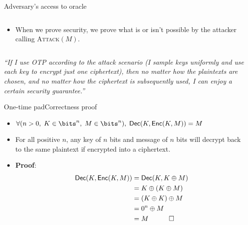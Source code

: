 \documentclass[aspectratio=169, lualatex, handout]{beamer}
\begin{document}
\begin{frame}{Adversary's access to oracle}
	\begin{columns}[c]
		\begin{column}{0.5\textwidth}
			\begin{itemize}
				\item When we prove security, we prove what is or isn’t possible by the attacker calling \textsc{Attack}$(M)$.
			\end{itemize}
		\end{column}
		\begin{column}{0.5\textwidth}
		\end{column}
	\end{columns}
\end{frame}

\begin{frame}
	\begin{center}
		\Large\textit{``If I use OTP according to the attack scenario (I sample keys uniformly and use each key to encrypt just one ciphertext), then no matter how the plaintexts are chosen, and no matter how the ciphertext is subsequently used, I can enjoy a certain security guarantee.''}
	\end{center}
\end{frame}

\begin{frame}{One-time pad}{Correctness proof}
	\begin{itemize}[<+->]
		\item $\forall(n > 0,\; K \in \bits^{n},\; M \in \bits^{n}),\; \textsf{Dec}(K, \textsf{Enc}(K, M)) = M$
		\item For all positive $n$, any key of $n$ bits and message of $n$ bits will decrypt back to the same plaintext if encrypted into a ciphertext.
		\item \textbf{Proof}:
		      \begin{align*}
			      \textsf{Dec}(K, \textsf{Enc}(K, M)) & = \textsf{Dec}(K, K \oplus M) \\
			                                          & = K \oplus (K \oplus M)       \\
			                                          & = (K \oplus K) \oplus M       \\
			                                          & = 0^n \oplus M                \\
			                                          & = M \quad \qed
		      \end{align*}
	\end{itemize}
\end{frame}
\end{document}
